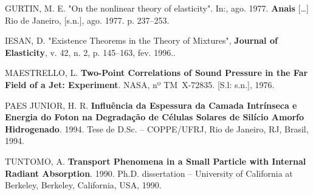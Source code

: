 \documentclass[grad,numbers]{coppe}
\begin{document}
  \leavevmode\hypertarget{ref-inproceedings-example}{}%
  GURTIN, M. E. "On the nonlinear theory of elasticity". In:, ago. 1977. \textbf{Anais} {[}\ldots{]} Rio de Janeiro, {[}s.n.{]}, ago. 1977. p. 237--253.
  
  \leavevmode\hypertarget{ref-article-example}{}%
  IESAN, D. "Existence Theorems in the Theory of Mixtures", \textbf{Journal of Elasticity}, v. 42, n. 2, p. 145--163, fev. 1996..
  
  \leavevmode\hypertarget{ref-techreport-example}{}%
  MAESTRELLO, L. \textbf{Two-Point Correlations of Sound Pressure in the Far Field of a Jet: Experiment}. NASA, nº TM~X-72835. {[}S.l: s.n.{]}, 1976.
  
  \leavevmode\hypertarget{ref-phdthesis-example}{}%
  PAES JUNIOR, H. R. \textbf{Influência da Espessura da Camada Intrínseca e Energia do Foton na Degradação de Células Solares de Silício Amorfo Hidrogenado}. 1994. Tese de D.Sc. -- COPPE/UFRJ, Rio de Janeiro, RJ, Brasil, 1994.
  
  \leavevmode\hypertarget{ref-mastersthesis-example}{}%
  TUNTOMO, A. \textbf{Transport Phenomena in a Small Particle with Internal Radiant Absorption}. 1990. Ph.D. dissertation -- University of California at Berkeley, Berkeley, California, USA, 1990.

  \backmatter
  
  

\end{document}
